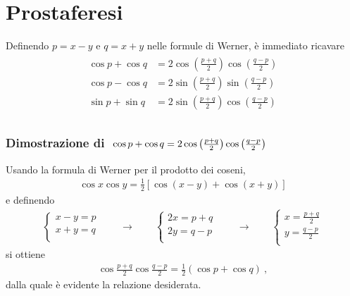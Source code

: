 \documentclass[letterpaper,10pt,italian]{jupyterBook}
\begin{document}
\section{Prostaferesi}
\label{\detokenize{ch/trigonometry:prostaferesi}}
\sphinxAtStartPar
Definendo \(p = x-y\) e \(q = x+y\) nelle formule di Werner, è immediato ricavare
\begin{equation*}
\begin{split}\begin{aligned}
  \cos p + \cos q & = 2 \cos\left(\frac{p+q}{2} \right) \cos\left(\frac{q-p}{2} \right) \\
  \cos p - \cos q & = 2 \sin\left(\frac{p+q}{2} \right) \sin\left(\frac{q-p}{2} \right) \\
  \sin p + \sin q & = 2 \sin\left(\frac{p+q}{2} \right) \cos\left(\frac{q-p}{2} \right) \\
\end{aligned}\end{split}
\end{equation*}\subsubsection*{Dimostrazione di \protect\(\ \cos p + \cos q = 2 \cos\left(\frac{p+q}{2} \right) \cos\left(\frac{q-p}{2} \right)\protect\)}

\sphinxAtStartPar
Usando la formula di Werner per il prodotto dei coseni,
\begin{equation*}
\begin{split}\cos x \cos y = \frac{1}{2} \left[ \cos(x-y) + \cos(x+y) \right]\end{split}
\end{equation*}
\sphinxAtStartPar
e definendo
\begin{equation*}
\begin{split}\begin{cases}
  x-y = p \\
  x+y = q \\
\end{cases}
\qquad \rightarrow \qquad
\begin{cases}
  2 x = p + q \\
  2 y = q - p \\
\end{cases}
\qquad \rightarrow \qquad
\begin{cases}
  x = \frac{ p + q }{2} \\
  y = \frac{ q - p }{2} \\
\end{cases}
\end{split}
\end{equation*}
\sphinxAtStartPar
si ottiene
\begin{equation*}
\begin{split}\cos \frac{p+q}{2} \cos\frac{q-p}{2} = \frac{1}{2} \left( \cos p + \cos q \right) \ ,\end{split}
\end{equation*}
\sphinxAtStartPar
dalla quale è evidente la relazione desiderata.
\end{document}
